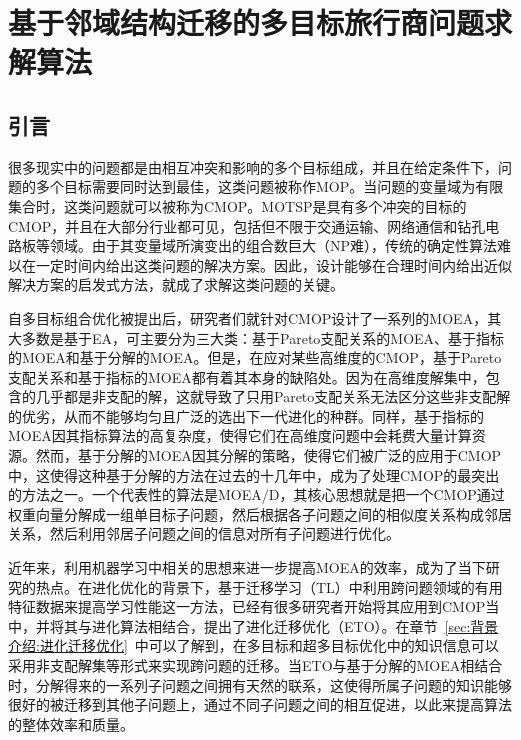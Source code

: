 \chapter{基于邻域结构迁移的多目标旅行商问题求解算法}
\label{chap:NST}

\section{引言}
\label{sec:NST:引言}
很多现实中的问题都是由相互冲突和影响的多个目标组成，并且在给定条件下，问题的多个目标需要同时达到最佳，这类问题被称作MOP。当问题的变量域为有限集合时，这类问题就可以被称为CMOP。MOTSP是具有多个冲突的目标的CMOP，并且在大部分行业都可见，包括但不限于交通运输、网络通信和钻孔电路板等领域。由于其变量域所演变出的组合数巨大（NP难），传统的确定性算法难以在一定时间内给出这类问题的解决方案。因此，设计能够在合理时间内给出近似解决方案的启发式方法，就成了求解这类问题的关键。
\par
自多目标组合优化被提出后，研究者们就针对CMOP设计了一系列的MOEA，其大多数是基于EA，可主要分为三大类：基于Pareto支配关系的MOEA\cite{zitzler1999multiobjective,deb2002fast,knowles2000approximating,yang2013grid,laumanns2002combining,hadka2013borg,le2009improved,aguirre2010hybrid,aguirre2013adaptive}、基于指标的MOEA\cite{zitzler2004indicator,bringmann2011approximation,brockhoff20152,rudolph2013evenly,beume2007sms,wagner2007pareto}和基于分解的MOEA\cite{zhang2007moea,zhang2009performance,li2014evolutionary,cheng2016reference,cai2016decomposition,yuan2015balancing}。但是，在应对某些高维度的CMOP，基于Pareto支配关系和基于指标的MOEA都有着其本身的缺陷处。因为在高维度解集中，包含的几乎都是非支配的解，这就导致了只用Pareto支配关系无法区分这些非支配解的优劣，从而不能够均匀且广泛的选出下一代进化的种群。同样，基于指标的MOEA因其指标算法的高复杂度，使得它们在高维度问题中会耗费大量计算资源。然而，基于分解的MOEA因其分解的策略，使得它们被广泛的应用于CMOP中，这使得这种基于分解的方法在过去的十几年中，成为了处理CMOP的最突出的方法之一。一个代表性的算法是MOEA/D\cite{zhang2007moea}，其核心思想就是把一个CMOP通过权重向量分解成一组单目标子问题，然后根据各子问题之间的相似度关系构成邻居关系，然后利用邻居子问题之间的信息对所有子问题进行优化。
\par
近年来，利用机器学习中相关的思想来进一步提高MOEA的效率，成为了当下研究的热点。在进化优化的背景下，基于迁移学习（TL）中利用跨问题领域的有用特征数据来提高学习性能这一方法，已经有很多研究者开始将其应用到CMOP当中，并将其与进化算法相结合，提出了进化迁移优化（ETO）\cite{feng2020explicit,lin2020effective,tan2021evolutionary}。在章节~\ref{sec:背景介绍:进化迁移优化}~中可以了解到，在多目标和超多目标优化中的知识信息可以采用非支配解集等形式来实现跨问题的迁移。当ETO与基于分解的MOEA相结合时，分解得来的一系列子问题之间拥有天然的联系，这使得所属子问题的知识能够很好的被迁移到其他子问题上，通过不同子问题之间的相互促进，以此来提高算法的整体效率和质量。

